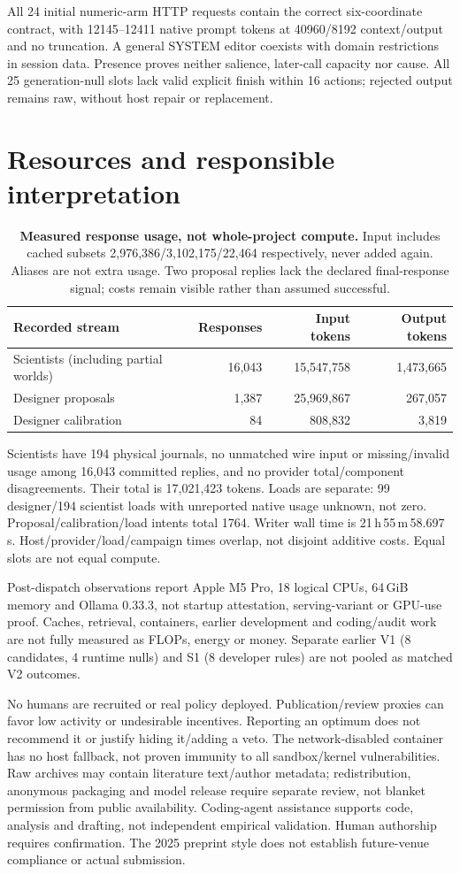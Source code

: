 \documentclass{article}
\begin{document}
All 24 initial numeric-arm HTTP requests contain the correct six-coordinate
contract, with 12145--12411 native prompt tokens at 40960/8192 context/output and
no truncation. A general SYSTEM editor coexists with domain restrictions in
session data. Presence proves neither salience, later-call capacity nor cause.
All 25 generation-null slots lack valid explicit finish within 16 actions;
rejected output remains raw, without host repair or replacement.

\clearpage
\section{Resources and responsible interpretation}
\begin{table}[h]\centering\small
\begin{tabular}{@{}lrrr@{}}\toprule
Recorded stream & Responses & Input tokens & Output tokens\\\midrule
Scientists (including partial worlds)&16,043&15,547,758&1,473,665\\
Designer proposals&1,387&25,969,867&267,057\\
Designer calibration&84&808,832&3,819\\\bottomrule
\end{tabular}
\caption{\textbf{Measured response usage, not whole-project compute.} Input
includes cached subsets 2,976,386/3,102,175/22,464 respectively, never added
again. Aliases are not extra usage. Two proposal replies lack the declared
final-response signal; costs remain visible rather than assumed successful.}
\end{table}
Scientists have 194 physical journals, no unmatched wire input or missing/invalid
usage among 16,043 committed replies, and no provider total/component disagreements.
Their total is 17,021,423 tokens. Loads are separate: 99 designer/194 scientist
loads with unreported native usage unknown, not zero. Proposal/calibration/load
intents total 1764. Writer wall time is 21\,h\,55\,m\,58.697\,s. Host/provider/load/campaign
times overlap, not disjoint additive costs. Equal slots are not equal compute.

Post-dispatch observations report Apple M5 Pro, 18 logical CPUs, 64\,GiB memory
and Ollama 0.33.3, not startup attestation, serving-variant or GPU-use proof.
Caches, retrieval, containers, earlier development and coding/audit work are not
fully measured as FLOPs, energy or money. Separate earlier V1 (8 candidates,
4 runtime nulls) and S1 (8 developer rules) are not pooled as matched V2 outcomes.

No humans are recruited or real policy deployed. Publication/review proxies can
favor low activity or undesirable incentives. Reporting an optimum does not
recommend it or justify hiding it/adding a veto. The network-disabled container
has no host fallback, not proven immunity to all sandbox/kernel vulnerabilities.
Raw archives may contain literature text/author metadata; redistribution,
anonymous packaging and model release require separate review, not blanket
permission from public availability. Coding-agent assistance supports code,
analysis and drafting, not independent empirical validation. Human authorship
requires confirmation. The 2025 preprint style does not establish future-venue
compliance or actual submission.
\end{document}
